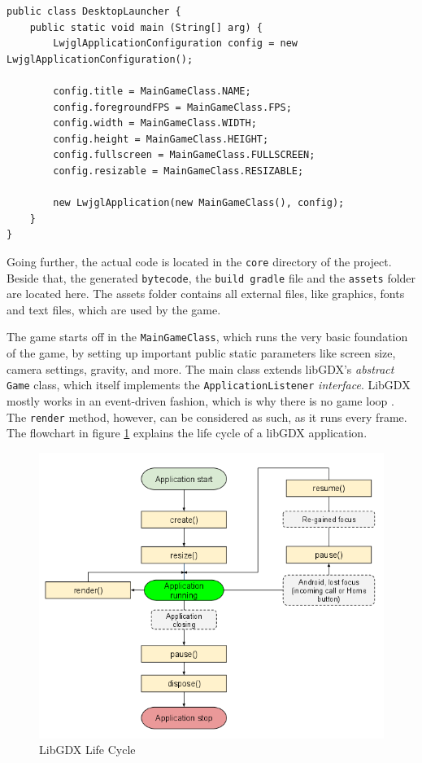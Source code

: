 \documentclass[12p]{article}
\begin{document}
\begin{verbatim}
public class DesktopLauncher {
	public static void main (String[] arg) {
		LwjglApplicationConfiguration config = new LwjglApplicationConfiguration();

		config.title = MainGameClass.NAME;
		config.foregroundFPS = MainGameClass.FPS;
		config.width = MainGameClass.WIDTH;
		config.height = MainGameClass.HEIGHT;
		config.fullscreen = MainGameClass.FULLSCREEN;
		config.resizable = MainGameClass.RESIZABLE;

		new LwjglApplication(new MainGameClass(), config);
	}
}
\end{verbatim}

Going further, the actual code is located in the \texttt{core} directory of the project. Beside that, the generated \texttt{bytecode}, the \texttt{build gradle} file and the \texttt{assets} folder are located here. The assets folder contains all external files, like graphics, fonts and text files, which are used by the game.

The game starts off in the \texttt{MainGameClass}, which runs the very basic foundation of the game, by setting up important public static parameters like screen size, camera settings, gravity, and more. The main class extends libGDX's \emph{abstract} \texttt{Game} class, which itself implements the \texttt{ApplicationListener} \emph{interface}. LibGDX mostly works in an event-driven fashion, which is why there is no game loop \cite{libGDXLifeCycle}. The \texttt{render} method, however, can be considered as such, as it runs every frame. The flowchart in figure \ref{fig:LibGDXLifeCycle} explains the life cycle of a libGDX application.

\begin{figure}[ht]
  \center
  \includegraphics[width=1\textwidth]{Documentation/lifeCycle}
  \caption{LibGDX Life Cycle \cite{libGDXLifeCycle}}
  \label{fig:LibGDXLifeCycle}
\end{figure}
\end{document}
